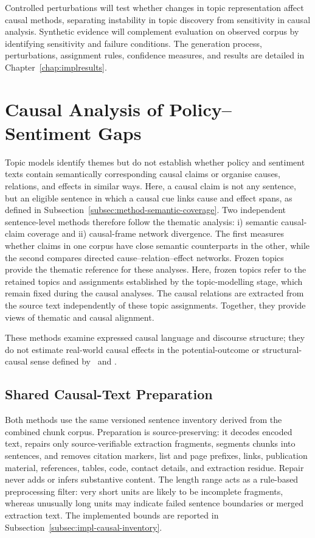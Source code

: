 Controlled perturbations will test whether changes in topic representation affect
causal methods, separating instability in topic discovery from sensitivity in causal
analysis. Synthetic evidence will complement evaluation on observed corpus by
identifying sensitivity and failure conditions. The generation process,
perturbations, assignment rules, confidence measures, and results are detailed in
Chapter~\ref{chap:implresults}.

\section{Causal Analysis of Policy--Sentiment Gaps}
\label{sec:method-causal-nlp}

Topic models identify themes but do not establish whether policy and sentiment texts
contain semantically corresponding causal claims or organise causes, relations, and
effects in similar ways. Here, a causal claim is not any sentence, but an eligible
sentence in which a causal cue links cause and effect spans, as defined in
Subsection~\ref{subsec:method-semantic-coverage}. Two independent sentence-level
methods therefore follow the thematic analysis: i) semantic causal-claim coverage and
ii) causal-frame network divergence. The first measures whether claims in one corpus
have close semantic counterparts in the other, while the second compares directed
cause--relation--effect networks. Frozen topics provide the thematic reference for
these analyses. Here, frozen topics refer to the retained topics and assignments
established by the topic-modelling stage, which remain fixed during the causal
analyses. The causal relations are extracted from the source text independently of
these topic assignments. Together, they provide views of thematic and causal
alignment.

These methods examine expressed causal language and discourse structure; they do not
estimate real-world causal effects in the potential-outcome or structural-causal
sense defined by~\cite{rubin1974estimating} and \cite{pearl2009causality}.

\subsection{Shared Causal-Text Preparation}
\label{subsec:method-shared-causal-cleaning}

Both methods use the same versioned sentence inventory derived from the combined
chunk corpus. {\color{blue}Preparation is source-preserving: it decodes encoded text,
repairs only source-verifiable extraction fragments,} segments chunks into sentences,
and removes citation markers, list and page prefixes, links, publication material,
references, tables, code, contact details, and extraction residue.
{\color{blue}Repair never adds or infers substantive content.} The length range acts
as a rule-based preprocessing filter: very short units are likely to be incomplete
fragments, whereas unusually long units may indicate failed sentence boundaries or
merged extraction text. The implemented bounds are reported in
Subsection~\ref{subsec:impl-causal-inventory}.


